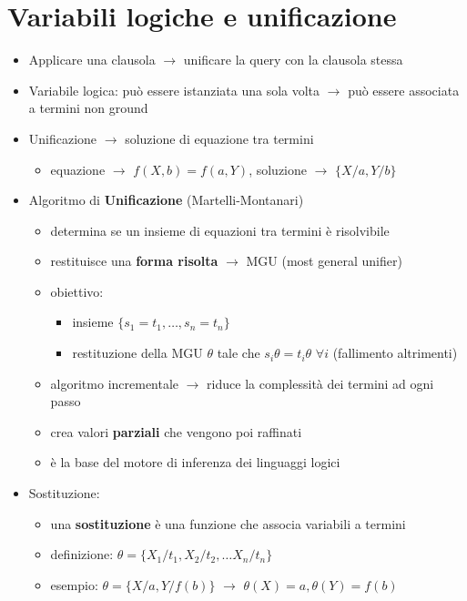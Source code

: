 \documentclass[12pt]{extarticle}
\begin{document}
\section*{Variabili logiche e unificazione}
\begin{itemize}
  \item Applicare una clausola $\rightarrow$ unificare la query con la clausola stessa
  \item Variabile logica: può essere istanziata una sola volta $\rightarrow$ può essere associata a termini non ground
  \item Unificazione $\rightarrow$ soluzione di equazione tra termini
  \begin{itemize}
    \item equazione $\rightarrow$ $f(X,b) = f(a, Y)$, soluzione $\rightarrow$ $\{X/a, Y/b\}$
  \end{itemize}
  \item  Algoritmo di \textbf{Unificazione} (Martelli-Montanari)
  \begin{itemize}
    \item determina se un insieme di equazioni tra termini è risolvibile
    \item restituisce una \textbf{forma risolta} $\rightarrow$ MGU (most general unifier)
    \item obiettivo:
    \begin{itemize}
      \item insieme $\{s_1 = t_1, \dots, s_n = t_n\}$
      \item restituzione della MGU $\theta$ tale che $s_i\theta = t_i\theta$ $\forall i$ (fallimento altrimenti)
    \end{itemize}
    \item algoritmo incrementale $\rightarrow$ riduce la complessità dei termini ad ogni passo
    \item crea valori \textbf{parziali} che vengono poi raffinati
    \item è la base del motore di inferenza dei linguaggi logici
  \end{itemize}
  \item Sostituzione:
  \begin{itemize}
    \item una \textbf{sostituzione} è una funzione che associa variabili a termini
    \item definizione: $\theta = \{X_1/t_1, X_2/t_2, \dots X_n/t_n\}$
    \item esempio: $\theta = \{X/a, Y/f(b)\}$ $\rightarrow$ $\theta(X) = a, \theta(Y) = f(b)$

\end{itemize}
\end{itemize}
\end{document}
